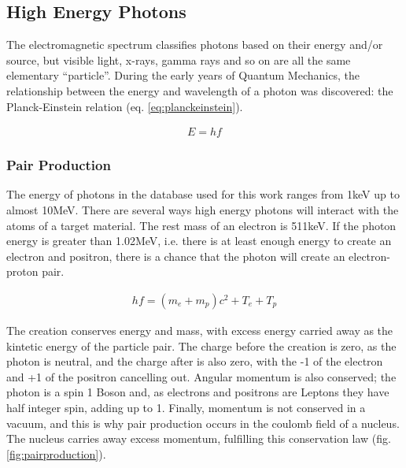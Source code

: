 \FloatBarrier
\subsection{High Energy Photons}

The electromagnetic spectrum classifies photons based on their energy and/or source, but visible light, x-rays, gamma rays and so on are all the same elementary \enquote{particle}.  During the early years of Quantum Mechanics, the relationship between the energy and wavelength of a photon was discovered: the Planck-Einstein relation (eq. \ref{eq:planckeinstein}).

\begin{equation}
\begin{split}
E = h f
\end{split}
\label{eq:planckeinstein}
\end{equation}

\subsubsection{Pair Production}

The energy of photons in the database used for this work ranges from 1keV up to almost 10MeV.  There are several ways high energy photons will interact with the atoms of a target material.  The rest mass of an electron is 511keV.  If the photon energy is greater than 1.02MeV, i.e. there is at least enough energy to create an electron and positron, there is a chance that the photon will create an electron-proton pair.  

\begin{equation}
\begin{split}
h f = (m_e + m_p) c^2 + T_e + T_p
\end{split}
\end{equation}

The creation conserves energy and mass, with excess energy carried away as the kintetic energy of the particle pair.  The charge before the creation is zero, as the photon is neutral, and the charge after is also zero, with the -1 of the electron and +1 of the positron cancelling out.  Angular momentum is also conserved; the photon is a spin 1 Boson and, as electrons and positrons are Leptons they have half integer spin, adding up to 1.  Finally, momentum is not conserved in a vacuum, and this is why pair production occurs in the coulomb field of a nucleus.  The nucleus carries away excess momentum, fulfilling this conservation law (fig. \ref{fig:pairproduction}).

